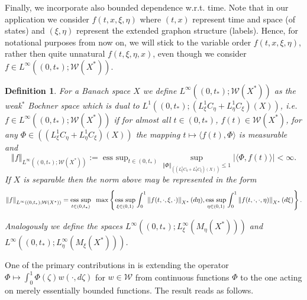 \documentclass[10pt]{article}
\newtheorem{defi}{Definition}
\DeclareMathOperator*{\esssup}{ess~sup}
\newcommand{\hd}{\hspace{0.2cm}}
\newcommand*{\norm}[1]{\left\Vert{#1}\right\Vert}
\newcommand*{\abs}[1]{\left\vert{#1}\right\vert}
\newcommand{\izj}{\int_{0}^{1}}
\newcommand{\W}{\mathcal{W}}
\begin{document}
Finally, we incorporate also bounded dependence w.r.t. time.
Note that in our application we consider $f(t,x,\xi,\eta)$ where $(t,x)$ represent time and space (of states) and $(\xi,\eta)$ represent the extended graphon structure (labels). Hence, for notational purposes from now on, we will stick to the variable order $f(t,x,\xi,\eta)$, rather then quite unnatural  $f(t,\xi,\eta,x)$,  even though we consider $f \in L^{\infty}((0,t_{*});\W(X^{*}))$.

\begin{defi}\label{weakspacedef}
For a Banach space $X$ we define  
  $ L^{\infty}((0,t_{*});\W(X^{*}))$ as the weak$^*$ Bochner space which is dual to $L^{1}((0,t_{*});(L^1_\xi C_\eta + L^1_\eta C_\xi)(X))$, i.e. $f \in L^{\infty}((0,t_{*});\W(X^{*}))$ if for almost all $t\in (0,t_{*})$, $f(t) \in \W(X^{*})$, for any $\Phi \in ((L^1_\xi C_\eta + L^1_\eta C_\xi)(X))$ the mapping $t\mapsto \langle f(t), \Phi \rangle$ is measurable and
\[
\norm{f}_{L^{\infty}((0,t_{*});\W(X^{*}))}:=\esssup_{t\in (0,t_{*})}\sup_{\norm{\Phi}_{((L^1_\xi C_\eta + L^1_\eta C_\xi)(X))}\leq 1}\abs{\langle \Phi, f(t)  \rangle} < \infty.
\]
If $X$ is separable then  the norm above may be represented in the form 
\[
\norm{f}_{L^{\infty}((0,t_{*});\W(X^{*}))}=\esssup_{t \in (0,t_{*})} \hd\max\left\{\esssup_{\xi\in (0,1)}\izj \norm{f(t,\cdot,\xi,\cdot)}_{X^{*}}(d\eta), \esssup_{\eta\in (0,1)}\izj \norm{f(t,\cdot,\cdot,\eta)}_{X^{*}}(d\xi) \right\}.
\]

Analogously we define the spaces $L^{\infty}((0,t_{*});L^{\infty}_\xi(M_\eta(X^{*})))$ and $L^{\infty}((0,t_{*});L^{\infty}_\eta(M_\xi(X^{*})))$.
\end{defi}

One of the primary contributions in \cite{JPS2025} is extending the operator $\Phi\mapsto \int_0^1\Phi(\zeta)w(\cdot,d\zeta)$ for $w \in \W$ from continuous functions $\Phi$ to the one acting on merely essentially bounded functions. The result reads as follows.
\end{document}
